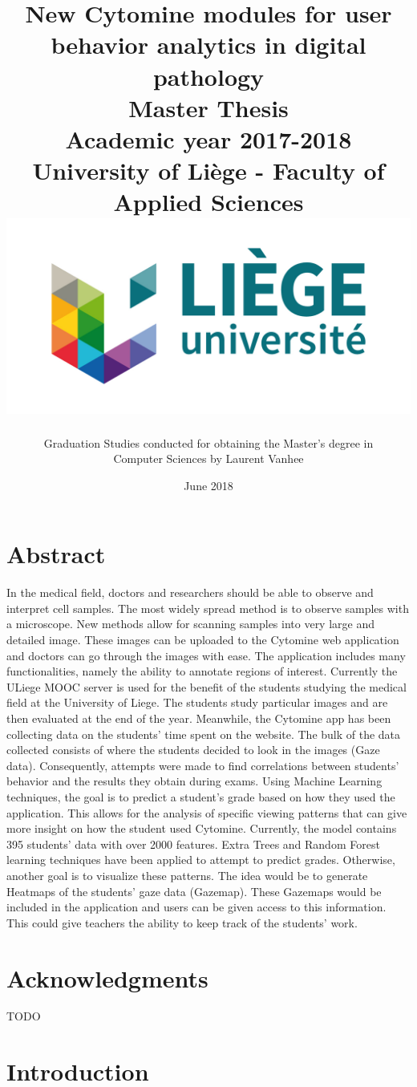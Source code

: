 \documentclass[a4paper,11pt]{report}
\title{
\LARGE
\textbf{New Cytomine modules for user behavior analytics in digital pathology}\\
\vspace{1cm}
Master Thesis\\
\vspace{0.3cm}
Academic year 2017-2018\\
University of Li\`{e}ge - Faculty of Applied Sciences\\
\vspace{3cm}
\includegraphics[scale=0.75]{images/logo.jpg}
\vspace{2cm}
}
\author{ Graduation Studies conducted for obtaining the Master's degree in \\Computer Sciences by Laurent Vanhee}
\date{June 2018}
\numberwithin{figure}{section} %
\begin{document}
\pagestyle{empty}
\maketitle
\pagestyle{fancy}
\fancyhf{}
\tableofcontents


\newpage
\chapter{Abstract}
In the medical field, doctors and researchers should be able to observe and interpret cell samples.
The
most widely spread method is to observe samples with a microscope.
New methods allow for scanning
samples into very large and detailed image.
These images can be uploaded to the Cytomine web
application and doctors can go through the images with ease.
The application includes many
functionalities, namely the ability to annotate regions of interest.
Currently the ULiege MOOC server is
used for the benefit of the students studying the medical field at the University of Liege.
The students
study particular images and are then evaluated at the end of the year.
Meanwhile, the Cytomine app
has been collecting data on the students' time spent on the website.
The bulk of the data collected
consists of where the students decided to look in the images (Gaze data).
Consequently, attempts  were made to find correlations between students' behavior and the results they obtain during exams.
Using Machine
Learning techniques, the goal is to predict a student's grade based on how they used the application.
This allows for the analysis of specific viewing patterns that can give more insight on how the student used Cytomine.
Currently, the model contains 395 students' data with over 2000 features.
Extra Trees and Random Forest
learning techniques have been applied to attempt to predict grades.
Otherwise, another goal is to
visualize these patterns.
The idea would be to generate Heatmaps of the students' gaze data (Gazemap).
These Gazemaps would be included in the application and users can be given access to this information.
This
could give teachers the ability to keep track of the students' work.

\chapter{Acknowledgments}
    {\color{red} TODO}

\chapter{Introduction}
\end{document}
